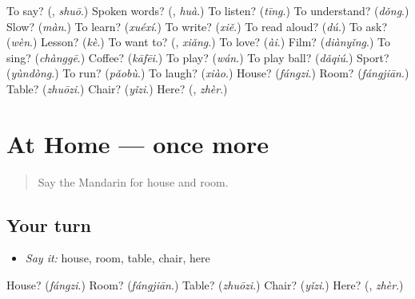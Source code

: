 \begin{tcolorbox}[breakable,colback=teal!4,colframe=teal!35!black,title={Before you move on}]
To say? (\textbf{}, \emph{shuō}.) Spoken words? (\textbf{}, \emph{huà}.) To listen? (\emph{tīng}.) To understand? (\emph{dǒng}.) Slow? (\emph{màn}.) To learn? (\emph{xuéxí}.) To write? (\emph{xiě}.) To read aloud? (\emph{dú}.) To ask? (\emph{wèn}.) Lesson? (\emph{kè}.) To want to? (\textbf{}, \emph{xiǎng}.) To love? (\emph{ài}.) Film? (\emph{diànyǐng}.) To sing? (\emph{chànggē}.) Coffee? (\emph{kāfēi}.) To play? (\emph{wán}.) To play ball? (\emph{dǎqiú}.) Sport? (\emph{yùndòng}.) To run? (\emph{pǎobù}.) To laugh? (\emph{xiào}.) House? (\emph{fángzi}.) Room? (\emph{fángjiān}.) Table? (\emph{zhuōzi}.) Chair? (\emph{yǐzi}.) Here? (\textbf{}, \emph{zhèr}.)
\end{tcolorbox}
\section[(dialogue)]{At Home — once more}

\label{lesson:ZH-R57-review-final-57}



\begin{quote}
Say the Mandarin for house and room.
\end{quote}

\subsection*{Your turn}
\begin{itemize}
\raggedright
  \item \emph{Say it:} house, room, table, chair, here
\end{itemize}

\begin{tcolorbox}[breakable,colback=teal!4,colframe=teal!35!black,title={Before you move on}]
House? (\emph{fángzi}.) Room? (\emph{fángjiān}.) Table? (\emph{zhuōzi}.) Chair? (\emph{yǐzi}.) Here? (\textbf{}, \emph{zhèr}.)
\end{tcolorbox}
